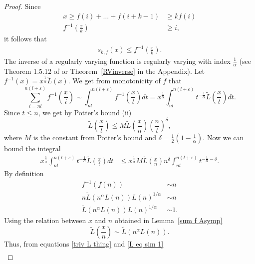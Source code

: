 \documentclass[10pt]{article}
\theoremstyle{plain}
\theoremstyle{definition}
\let\epsilon\varepsilon
\begin{document}
	\begin{proof}
		Since
		\begin{align}
			x\ge f(i)+\dots+f(i+k-1)&\ge kf(i)\\
			f^{-1}\left(\frac{x}{k}\right)&\ge i,
		\end{align}	 
		it follows that 
		\begin{align}
			s_{k, f}(x)\le f^{-1}\left(\frac{x}{k}\right).\label{invUpperbound}
		\end{align} 
		The inverse of a regularly varying function is regularly varying with index $\frac{1}{\alpha}$ (see Theorem 1.5.12 of \cite{bingham1987regular} or Theorem~\ref{RVinverse} in the Appendix). Let $f^{-1}(x)=x^{\frac{1}{\alpha}}\tilde{L}(x)$. 
		We get from monotonicity of $f$ that
		\begin{equation}
			\sum_{i=nl}^{n(l+\epsilon)} f^{-1}\left(\frac{x}{i}\right)\sim \int_{nl}^{n(l+\epsilon)} f^{-1}\left(\frac{x}{t}\right)dt=x^{\frac{1}{\alpha}}\int_{nl}^{n(l+\epsilon)} t^{-\frac{1}{\alpha}}\tilde{L}\left(\frac{x}{t}\right)dt.
		\end{equation}
		Since $t\leq n$, we get by Potter's bound (ii)
		\begin{equation}
			\tilde{L}\left(\frac{x}{t}\right)\le M\tilde{L}\left(\frac{x}{n}\right)\left(\frac{n}{t}\right)^{\delta},
		\end{equation}
		where $M$ is the constant from Potter's bound and $\delta=\frac{1}{2}(1-\frac{1}{\alpha})$. Now we can bound the integral
		\begin{align}
			x^{\frac{1}{\alpha}}\int_{nl}^{n(l+\epsilon)} t^{-\frac{1}{\alpha}}\tilde{L}\left(\frac{x}{t}\right)dt&\le
			x^{\frac{1}{\alpha}}M\tilde{L}\left(\frac{x}{n}\right)n^\delta\int_{nl}^{n(l+\epsilon)} t^{-\frac{1}{\alpha}-\delta}.
		\end{align}
		By definition
		\begin{align}
			f^{-1}(f(n))&\sim n\\
			n\tilde{L}(n^\alpha L(n))L(n)^{1/\alpha}&\sim n\\
			\tilde{L}(n^\alpha L(n))L(n)^{1/\alpha}&\sim 1. \label{L eq sim 1}
		\end{align}
		Using the relation between $x$ and $n$ obtained in Lemma~\ref{sum f Asymp}
		\begin{equation}
			\tilde{L}\left(\frac{x}{n}\right)\sim \tilde{L}\left(n^\alpha L(n)\right).\label{triv L thing}
		\end{equation}
		Thus, from equations \ref{triv L thing} and \ref{L eq sim 1}
		\begin{align}

\end{align}
\end{proof}
\end{document}
